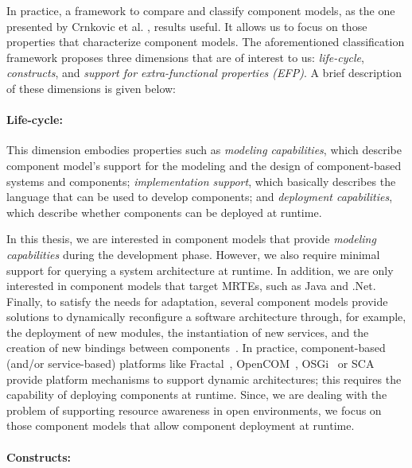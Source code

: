 In practice, a framework to compare and classify component models, as the one presented by Crnkovic et al.
\cite{Crnkovic2011}, results useful.
It allows us to focus on those properties that characterize component models.
The aforementioned classification framework proposes three dimensions that are of interest to us: \textit{life-cycle}, \textit{constructs}, and \textit{support for extra-functional properties (EFP)}.
A brief description of these dimensions is given below:

\paragraph{Life-cycle:}

This dimension embodies properties such as \textit{modeling capabilities}, which describe component model's support for the modeling and the design of component-based systems and components; 
\textit{implementation support}, which basically describes the language that can be used to develop components; and \textit{deployment capabilities}, which describe whether components can be deployed at runtime.

In this thesis, we are interested in component models that provide \textit{modeling capabilities} during the development phase.
However, we also require minimal support for querying a system architecture at runtime. 
In addition, we are only interested in component models that target MRTEs, such as Java and .Net.
Finally, to satisfy the needs for adaptation, several component models provide solutions to dynamically reconfigure a software architecture through, for example, the deployment of new modules, the instantiation of new services, and the creation of new bindings between components~\cite{Porter:2014:RMC:2602458.2602471, Zheng:2014:RCC:2679601.2680405, Irmert:2008:RAS:1370018.1370036, Ghezzi:2010:QDD:2163764.2163774}. 
In practice, component-based (and/or service-based) platforms like Fractal~\cite{bruneton06}, OpenCOM~\cite{BlairCULJ04}, OSGi~\cite{OSGI:r5} or SCA~\cite{SEINTURIER:2011:INRIA-00567442:1} provide platform mechanisms to support dynamic architectures; this requires the capability of deploying components at runtime.
Since, we are dealing with the problem of supporting resource awareness in open environments, we focus on those component models that allow component deployment at runtime.


\paragraph{Constructs:}

